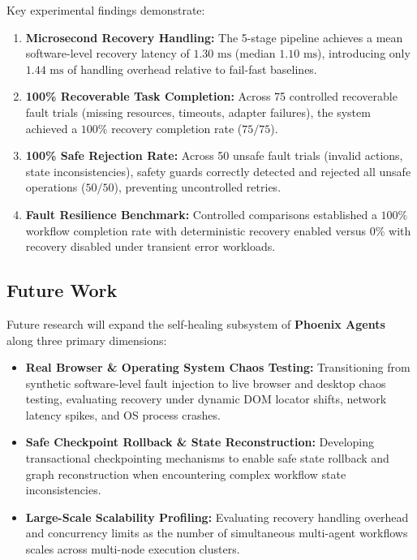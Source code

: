 \documentclass[conference]{IEEEtran}
\begin{document}
Key experimental findings demonstrate:
\begin{enumerate}
    \item \textbf{Microsecond Recovery Handling:} The 5-stage pipeline achieves a mean software-level recovery latency of $1.30\text{ ms}$ (median $1.10\text{ ms}$), introducing only $1.44\text{ ms}$ of handling overhead relative to fail-fast baselines.
    \item \textbf{100\% Recoverable Task Completion:} Across 75 controlled recoverable fault trials (missing resources, timeouts, adapter failures), the system achieved a $100\%$ recovery completion rate ($75/75$).
    \item \textbf{100\% Safe Rejection Rate:} Across 50 unsafe fault trials (invalid actions, state inconsistencies), safety guards correctly detected and rejected all unsafe operations ($50/50$), preventing uncontrolled retries.
    \item \textbf{Fault Resilience Benchmark:} Controlled comparisons established a $100\%$ workflow completion rate with deterministic recovery enabled versus $0\%$ with recovery disabled under transient error workloads.
\end{enumerate}

\subsection{Future Work}
Future research will expand the self-healing subsystem of \textbf{Phoenix Agents} along three primary dimensions:
\begin{itemize}
    \item \textbf{Real Browser \& Operating System Chaos Testing:} Transitioning from synthetic software-level fault injection to live browser and desktop chaos testing, evaluating recovery under dynamic DOM locator shifts, network latency spikes, and OS process crashes.
    \item \textbf{Safe Checkpoint Rollback & State Reconstruction:} Developing transactional checkpointing mechanisms to enable safe state rollback and graph reconstruction when encountering complex workflow state inconsistencies.
    \item \textbf{Large-Scale Scalability Profiling:} Evaluating recovery handling overhead and concurrency limits as the number of simultaneous multi-agent workflows scales across multi-node execution clusters.
\end{itemize}
\end{document}
